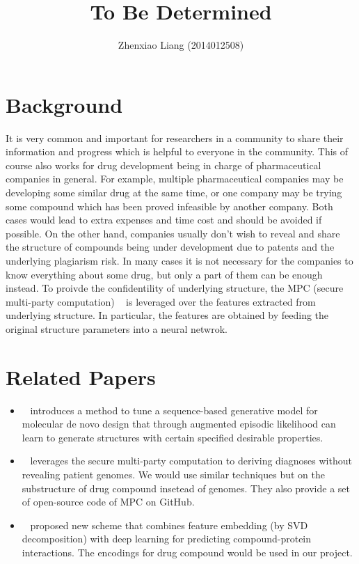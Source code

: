 \documentclass[]{article}
\title{To Be Determined}
\author{Zhenxiao Liang (2014012508)}
\begin{document}
\maketitle

\section{Background}

It is very common and important for researchers in a community to share their information and progress which is helpful to everyone in the community. This of course also works for drug development being in charge of pharmaceutical companies in general. For example, multiple pharmaceutical companies may be developing some similar drug at the same time, or one company may be trying some compound which has been proved infeasible by another company. Both cases would lead to extra expenses and time cost and should be avoided if possible. On the other hand, companies usually don’t wish to reveal and share the structure of compounds being under development due to patents and the underlying plagiarism risk. In many cases it is not necessary for the companies to know everything about some drug, but only a part of them can be enough instead. To proivde the confidentility of underlying structure, the MPC (secure multi-party computation) ~\cite{cramer2015secure} is leveraged over the features extracted from underlying structure. In particular, the features are obtained by feeding the original structure parameters into a neural netwrok.

\section{Related Papers}
\begin{itemize}
	\item
	~\cite{DBLP:journals/corr/OlivecronaBEC17} introduces a method to tune a sequence-based generative model for molecular de novo design that through augmented episodic likelihood can learn to generate structures with certain specified desirable properties.
	\item 
	~\cite{Jagadeesh692} leverages the secure multi-party computation to deriving diagnoses without revealing patient genomes. We would use similar techniques but on the substructure of drug compound insetead of genomes. They also provide a set of open-source code of MPC on GitHub.
	\item 
	~\cite{Wan086033} proposed new scheme that combines feature embedding (by SVD decomposition) with deep learning for predicting compound-protein interactions. The encodings for drug compound would be used in our project.
\end{itemize}
\end{document}

